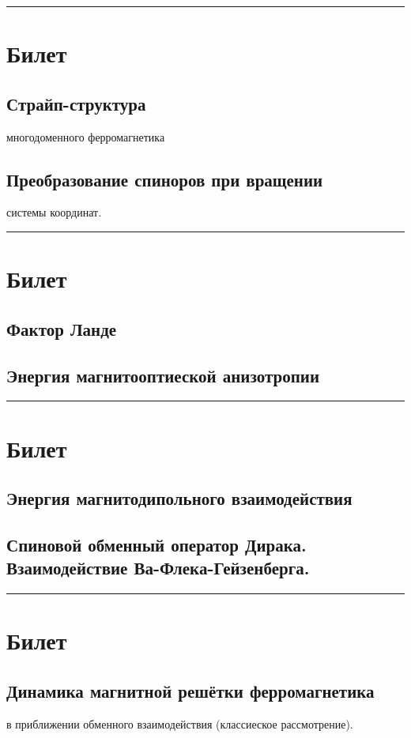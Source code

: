 \documentclass[a4paper, 14pt, russian]{article}
\newcommand{\ihline}{\noindent\rule{\textwidth}{1pt}}
\begin{document}
	\ihline

	\section{Билет}
		\subsection{Страйп-структура}
		многодоменного ферромагнетика
		\subsection{Преобразование спиноров при вращении}
		системы координат.

	\ihline
	
	\section{Билет}
		\subsection{Фактор Ланде}
		\subsection{Энергия магнитооптиеской анизотропии}

	\ihline

	\section{Билет}
		\subsection{Энергия магнитодипольного взаимодействия}
		\subsection{Спиновой обменный оператор Дирака.
		Взаимодействие Ва-Флека-Гейзенберга.}

	\ihline

	\section{Билет}
		\subsection{Динамика магнитной решётки ферромагнетика}
		в приближении обменного взаимодействия (классиеское рассмотрение).
\end{document}
